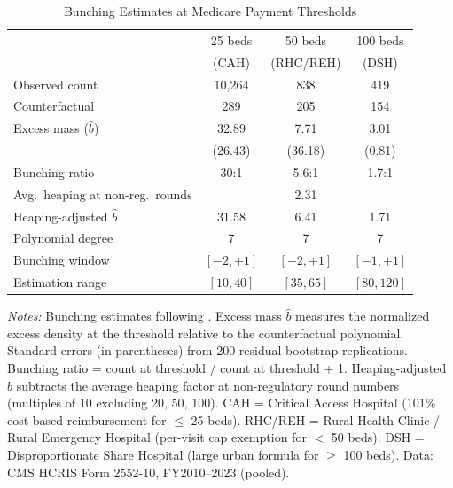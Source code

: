 \begin{table}[htbp]
\centering
\caption{Bunching Estimates at Medicare Payment Thresholds}
\label{tab:bunching}
\begin{tabular}{lccc}
\hline\hline
 & \multicolumn{1}{c}{25 beds} & \multicolumn{1}{c}{50 beds} & \multicolumn{1}{c}{100 beds} \\
 & \multicolumn{1}{c}{(CAH)} & \multicolumn{1}{c}{(RHC/REH)} & \multicolumn{1}{c}{(DSH)} \\
\hline
Observed count & 10,264 & 838 & 419 \\
Counterfactual & 289 & 205 & 154 \\
Excess mass ($\hat{b}$) & 32.89 & 7.71 & 3.01 \\
 & (26.43) & (36.18) & (0.81) \\
Bunching ratio & 30:1 & 5.6:1 & 1.7:1 \\
Avg.\ heaping at non-reg.\ rounds & \multicolumn{3}{c}{2.31} \\
Heaping-adjusted $\hat{b}$ & 31.58 & 6.41 & 1.71 \\
\hline
Polynomial degree & 7 & 7 & 7 \\
Bunching window & $[-2, +1]$ & $[-2, +1]$ & $[-1, +1]$ \\
Estimation range & $[10, 40]$ & $[35, 65]$ & $[80, 120]$ \\
\hline\hline
\end{tabular}
\begin{tablenotes}
\small
\item \textit{Notes:} Bunching estimates following \citet{kleven2016}. Excess mass $\hat{b}$ measures the normalized excess density at the threshold relative to the counterfactual polynomial. Standard errors (in parentheses) from 200 residual bootstrap replications. Bunching ratio = count at threshold / count at threshold + 1. Heaping-adjusted $\hat{b}$ subtracts the average heaping factor at non-regulatory round numbers (multiples of 10 excluding 20, 50, 100). CAH = Critical Access Hospital (101\% cost-based reimbursement for $\leq$ 25 beds). RHC/REH = Rural Health Clinic / Rural Emergency Hospital (per-visit cap exemption for $<$ 50 beds). DSH = Disproportionate Share Hospital (large urban formula for $\geq$ 100 beds). Data: CMS HCRIS Form 2552-10, FY2010--2023 (pooled).
\end{tablenotes}
\end{table}

